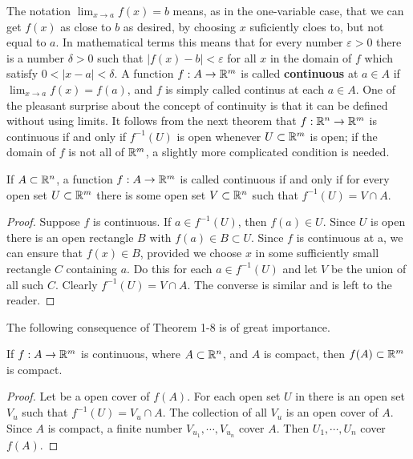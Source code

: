 The notation $\lim_{x\to a}{f(x)} = b$ means, as in the one-variable case, that we can get $f(x)$ as close to $b$
as desired, by choosing $x$ suficiently cloes to, but not equal to $a$. In mathematical terms this means that 
for every number $\varepsilon >0$ there is a number $\delta >0$ such that $|f(x)-b|<\varepsilon$ for all $x$ in 
the domain of $f$ which satisfy $0<|x-a|<\delta$. A function $f:A\to \mathbb{R}^m$ is called \textbf{continuous} at 
$a\in A$ if $\lim_{x\to a }{f(x)} = f(a)$, and $f$ is simply called continus at each $a\in A$. One of the pleasant
surprise about the concept of continuity is that it can be defined without using limits. It follows from the 
next theorem that $f:\mathbb{R}^n\to \mathbb{R}^m$ is continuous if and only if $f^{-1}(U)$ is open whenever $U\subset \mathbb{R}^m$
is open; if the domain of $f$ is not all of $\mathbb{R}^m$, a slightly more complicated condition is needed.

\begin{theorem}
    If $A\subset \mathbb{R}^n$, a function $f:A\to \mathbb{R}^m$ is called continuous if and only if 
    for every open set $U\subset \mathbb{R}^m$ there is some open set $V\subset \mathbb{R}^n$ such that $f^{-1}(U) = V\cap A$.
\end{theorem}

\begin{proof}
    Suppose $f$ is continuous. If $a\in f^{-1}(U)$, then $f(a)\in U$. Since $U$ is open there is an open rectangle
    $B$ with $f(a)\in B\subset U$. Since $f$ is continuous at a, we can ensure that $f(x)\in B$, provided we choose 
    $x$ in some sufficiently small rectangle $C$ containing $a$. Do this for each $a\in f^{-1}(U)$ and let $V$ be the 
    union of all such $C$. Clearly $f^{-1}(U) = V\cap A$. The converse is similar and is left to the reader.
\end{proof}

The following consequence of Theorem 1-8 is of great importance. 

\begin{theorem}
    If $f:A\to \mathbb{R}^m$ is continuous, where $A\subset \mathbb{R}^n$, and $A$ is compact, then 
    $f(A) \subset \mathbb{R}^m$ is compact.
\end{theorem}

\begin{proof}
    Let  be a open cover of $f(A)$. For each open set $U$ in  there is an open set $V_u$ such that 
    $f^{-1}(U) = V_u\cap A$. The collection of all $V_u$ is an open cover of $A$. Since $A$ is compact, a finite 
    number $V_{u_1},\cdots, V_{u_n}$ cover $A$. Then $U_1, \cdots, U_n$ cover $f(A)$.
\end{proof}

